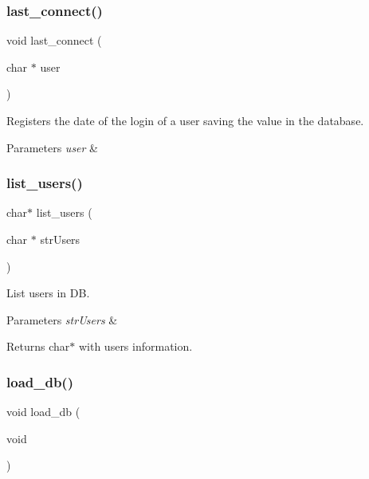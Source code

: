 \subsubsection{last\+\_\+connect()}
{\footnotesize\ttfamily void last\+\_\+connect (\begin{DoxyParamCaption}\item[{char $\ast$}]{user }\end{DoxyParamCaption})}



Registers the date of the login of a user saving the value in the database. 


\begin{DoxyParams}{Parameters}
{\em user} & \\
\hline
\end{DoxyParams}
\mbox{\label{auth_8h_a56c464f7248b65a5b16a96f3d5cb94af}} 
\subsubsection{list\+\_\+users()}
{\footnotesize\ttfamily char$\ast$ list\+\_\+users (\begin{DoxyParamCaption}\item[{char $\ast$}]{str\+Users }\end{DoxyParamCaption})}



List users in DB. 


\begin{DoxyParams}{Parameters}
{\em str\+Users} & \\
\hline
\end{DoxyParams}
\begin{DoxyReturn}{Returns}
char$\ast$ with users information. 
\end{DoxyReturn}
\mbox{\label{auth_8h_aca138a298c612a14d6fb2c16672f8c87}} 
\subsubsection{load\+\_\+db()}
{\footnotesize\ttfamily void load\+\_\+db (\begin{DoxyParamCaption}\item[{void}]{ }\end{DoxyParamCaption})}



